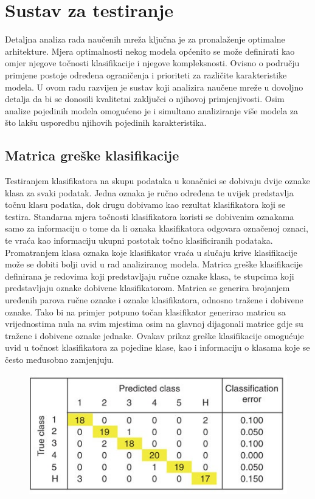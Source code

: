 \documentclass[lmodern, utf8, diplomski, numeric]{fer}
\begin{document}
\section{Sustav za testiranje}

Detaljna analiza rada naučenih mreža ključna je za pronalaženje optimalne arhitekture. Mjera optimalnosti nekog modela općenito se može definirati kao omjer njegove točnosti klasifikacije i njegove kompleksnosti. Ovisno o području primjene postoje određena ograničenja i prioriteti za različite karakteristike modela. U ovom radu razvijen je sustav koji analizira naučene mreže u dovoljno detalja da bi se donosili kvalitetni zaključci o njihovoj primjenjivosti. Osim analize pojedinih modela omogućeno je i simultano analiziranje više modela za što lakšu usporedbu njihovih pojedinih karakteristika.  

\subsection{Matrica greške klasifikacije}

Testiranjem klasifikatora na skupu podataka u konačnici se dobivaju dvije oznake klasa za svaki podatak. Jedna oznaka je ručno određena te uvijek predstavlja točnu klasu podatka, dok drugu dobivamo kao rezultat klasifikatora koji se testira. Standarna mjera točnosti klasifikatora koristi se dobivenim oznakama samo za informaciju o tome da li oznaka klasifikatora odgovara označenoj oznaci, te vraća kao informaciju ukupni postotak točno klasificiranih podataka. Promatranjem klasa oznaka koje klasifikator vraća u slučaju krive klasifikacije može se dobiti bolji uvid u rad analiziranog modela. 
Matrica greške klasifikacije definirana je redovima koji predstavljaju ručne oznake klasa, te stupcima koji predstavljaju oznake dobivene klasifikatorom. Matrica se generira brojanjem uređenih parova ručne oznake i oznake klasifikatora, odnosno tražene i dobivene oznake. Tako bi na primjer potpuno točan klasifikator generirao matricu sa vrijednostima nula na svim mjestima osim na glavnoj dijagonali matrice gdje su tražene i dobivene oznake jednake.
Ovakav prikaz greške klasifikacije omogućuje uvid u točnost klasifikatora za pojedine klase, kao i informaciju o klasama koje se često međusobno zamjenjuju.

\begin{figure}[ht!]
\centering
\includegraphics[width=13cm]{slike/confusion_matrix.jpg}
\caption{}
\end{figure}
\end{document}
